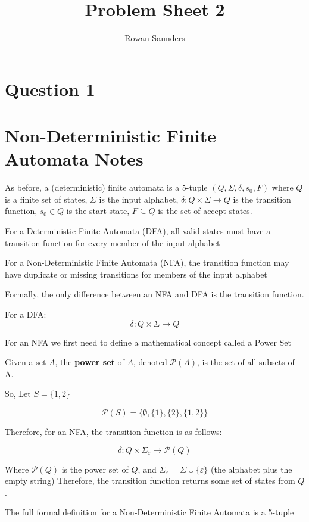 \documentclass[11pt]{article}
\title{Problem Sheet 2}
\author{Rowan Saunders}
\begin{document}
\begin{titlepage}
	\maketitle
\end{titlepage}

\section{Question 1}

\newpage
\section{Non-Deterministic Finite Automata Notes}
As before, a (deterministic) finite automata is a 5-tuple $ (Q, \Sigma, \delta,
s_0, F) $ where $Q$ is a finite set of states, $\Sigma$ is the input alphabet,
$\delta : Q \times \Sigma \to Q$ is the transition function, $s_0 \in Q$ is the
start state, $F \subseteq Q$ is the set of accept states.

For a Deterministic Finite Automata (DFA), all valid states must have a
transition function for every member of the input alphabet

For a Non-Deterministic Finite Automata (NFA), the transition function may have
duplicate or missing transitions for members of the input alphabet

Formally, the only difference between an NFA and DFA is the transition function.

For a DFA: $$\delta : Q \times \Sigma \to Q$$

For an NFA we first need to define a mathematical concept called a Power Set

Given a set $A$, the \textbf{power set} of $A$, denoted $\mathcal{P}(A)$, is the
set of all subsets of A.

So, Let $S=\{1,2\}$

$$\mathcal{P}(S)=\{\emptyset,\{1\}, \{2\}, \{1,2\}\}$$

Therefore, for an NFA, the transition function is as follows:

$$\delta : Q \times \Sigma_\varepsilon \to \mathcal{P}(Q)$$

Where $\mathcal{P}(Q)$ is the power set of $Q$, and $\Sigma_\varepsilon = \Sigma
\cup \{\varepsilon\}$ (the alphabet plus the empty string) Therefore, the
transition function returns some set of states from $Q$.

The full formal definition for a Non-Deterministic Finite Automata is a 5-tuple
\end{document}
